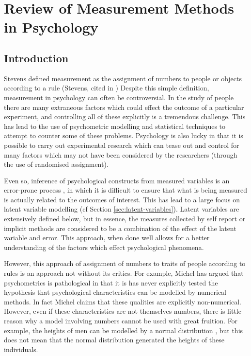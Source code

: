 \section{Review of Measurement Methods in Psychology}
\label{sec:revi-meas-meth}

\subsection{Introduction}
\label{sec:introduction}

Stevens defined measurement as the assignment of numbers to people or objects according to a rule (Stevens, cited in \cite{michell2000normal}) Despite this simple definition, measurement in psychology can often be controversial.  In the study of people there are many extraneous factors which could effect the outcome of a particular experiment, and controlling all of these explicitly is a tremendous challenge. This has lead to the use of psychometric modelling and statistical techniques to attempt to counter some of these problems. Psychology is also lucky in that it is possible to carry out experimental research which can tease out and control for many factors which may not have been considered by the researchers (through the use of randomised assignment). 

Even so, inference of psychological constructs from measured variables is an error-prone process \cite{Blanton2006d}, in which it is difficult to ensure that what is being measured is actually related to the outcomes of interest. This has lead to a large focus on latent variable modelling (cf Section \ref{sec:latent-variables}). Latent variables are extensively defined below, but in essence, the measures collected by self report or implicit methods are considered to be a combination of the effect of the latent variable and error. This approach, when done well allows for a better understanding of the factors which effect psychological phenomena. 

However, this approach of assignment of numbers to traits of people according to rules is an approach not without its critics. For example, Michel \cite{michell2000normal} has argued that psychometrics is pathological in that it is has never explicitly tested the hypothesis that psychological characteristics can be modelled by numerical methods. In fact Michel claims that these qualities are explicitly non-numerical. However, even if these characteristics are not themselves numbers, there is little reason why a model involving numbers cannot be used with great fruition. For example, the heights of men can be modelled by a normal distribution \cite{gelman2007data}, but this does not mean that the normal distribution generated the heights of these individuals. 

